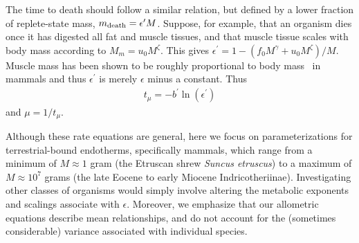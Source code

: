 \documentclass{pnastwo}
\begin{document}
\begin{article}
The time to death should follow a similar relation, but defined by a lower
fraction of replete-state mass, $m_{\rm death}=\epsilon^{\prime} M$.
Suppose, for example, that an organism dies once it has digested all fat and
muscle tissues, and that muscle tissue scales with body mass according to
$M_{m}=u_{0}M^{\zeta}$.  This gives
$\epsilon^{\prime}=1-\left(f_{0}M^{\gamma}+u_{0}M^{\zeta}\right)/M$. Muscle
mass has been shown to be roughly proportional to body mass~\cite{muscle} in
mammals and thus $\epsilon^{\prime}$ is merely $\epsilon$ minus a constant.
Thus
\begin{eqnarray}
t_{\mu}=-b^{\prime}\ln\left(\epsilon^{\prime}\right)
\end{eqnarray}
and $\mu=1/t_{\mu}$. 


Although these rate equations are general, here we focus on parameterizations
for terrestrial-bound endotherms, specifically mammals, which range from a
minimum of $M\approx1$ gram (the Etruscan shrew \emph{Suncus etruscus}) to a
maximum of $M\approx10^7$ grams (the late Eocene to early Miocene
Indricotheriinae).  Investigating other classes of organisms would simply
involve altering the metabolic exponents and scalings associate with
$\epsilon$. Moreover, we emphasize that our allometric equations describe
mean relationships, and do not account for the (sometimes considerable)
variance associated with individual species.
\\


\end{article}
\end{document}
